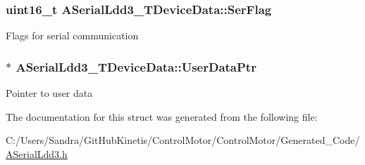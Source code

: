 \subsubsection[{\texorpdfstring{Ser\+Flag}{SerFlag}}]{\setlength{\rightskip}{0pt plus 5cm}uint16\+\_\+t A\+Serial\+Ldd3\+\_\+\+T\+Device\+Data\+::\+Ser\+Flag}\hypertarget{struct_a_serial_ldd3___t_device_data_ac5976cce408fe2fc499c24f47af3a7bf}{}\label{struct_a_serial_ldd3___t_device_data_ac5976cce408fe2fc499c24f47af3a7bf}
Flags for serial communication 
\subsubsection[{\texorpdfstring{User\+Data\+Ptr}{UserDataPtr}}]{$\ast$ A\+Serial\+Ldd3\+\_\+\+T\+Device\+Data\+::\+User\+Data\+Ptr}\hypertarget{struct_a_serial_ldd3___t_device_data_a9b759cfd3585dc45464d70f56388d773}{}\label{struct_a_serial_ldd3___t_device_data_a9b759cfd3585dc45464d70f56388d773}
Pointer to user data 

The documentation for this struct was generated from the following file\+:\begin{DoxyCompactItemize}
\item 
C\+:/\+Users/\+Sandra/\+Git\+Hub\+Kinetis/\+Control\+Motor/\+Control\+Motor/\+Generated\+\_\+\+Code/\hyperlink{_a_serial_ldd3_8h}{A\+Serial\+Ldd3.\+h}\end{DoxyCompactItemize}
